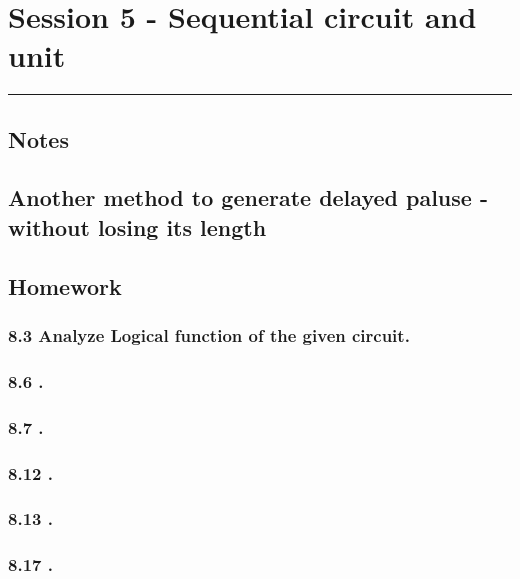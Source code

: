 \section{Session 5 - Sequential circuit and unit}
\vspace{-15pt}\noindent\rule{\textwidth}{0.1pt}\vspace{-10pt}
    \subsection{Notes}
    {\color{hwSolution}
    \subsection*{Another method to generate delayed paluse - without losing its length}
        
        
    }
    \subsection{Homework}
    \subsubsection{8.3 \textnormal{Analyze Logical function of the given circuit}.}
        
    {\color{hwSolution}
        
    }
 
    \subsubsection{8.6 \textnormal{}.}
    {\color{hwSolution}

    }

    \subsubsection{8.7 \textnormal{}.}
    {\color{hwSolution}
  
    }

    \subsubsection{8.12 \textnormal{}.}
    {\color{hwSolution}

    }

    \subsubsection{8.13 \textnormal{}.}
    {\color{hwSolution}

    }

    \subsubsection{8.17 \textnormal{}.}
    {\color{hwSolution}

    }